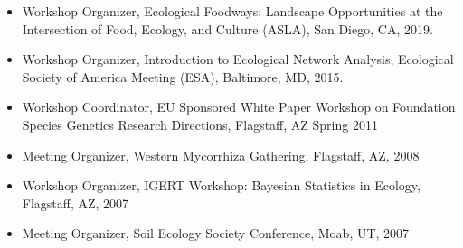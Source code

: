 \documentclass[a4paper]{article}
\begin{document}
\begin{itemize}
\item 
  Workshop Organizer, Ecological Foodways: Landscape Opportunities at
  the Intersection of Food, Ecology, and Culture (ASLA), San Diego,
  CA, 2019.
\item 
  Workshop Organizer, Introduction to Ecological Network Analysis,
  Ecological Society of America Meeting (ESA), Baltimore, MD, 2015.
\item
  Workshop Coordinator, EU Sponsored White Paper Workshop on Foundation
  Species Genetics Research Directions, Flagstaff, AZ Spring 2011
\item
  Meeting Organizer, Western Mycorrhiza Gathering, Flagstaff, AZ, 2008
\item
  Workshop Organizer, IGERT Workshop: Bayesian Statistics in Ecology,
  Flagstaff, AZ, 2007
\item
  Meeting Organizer, Soil Ecology Society Conference, Moab, UT, 2007
\end{itemize}
\end{document}
